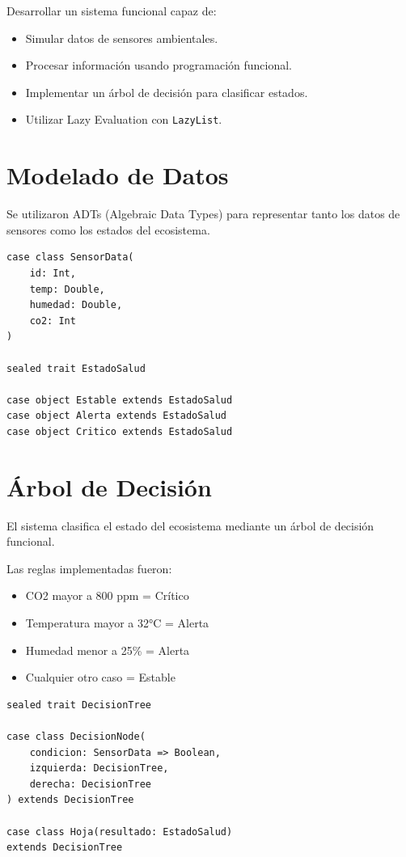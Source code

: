 \documentclass[12pt]{article}
\begin{document}
Desarrollar un sistema funcional capaz de:

\begin{itemize}
    \item Simular datos de sensores ambientales.
    \item Procesar información usando programación funcional.
    \item Implementar un árbol de decisión para clasificar estados.
    \item Utilizar Lazy Evaluation con \texttt{LazyList}.
\end{itemize}


\section{Modelado de Datos}

Se utilizaron ADTs (Algebraic Data Types) para representar tanto los datos de sensores como los estados del ecosistema.

\begin{lstlisting}
case class SensorData(
    id: Int,
    temp: Double,
    humedad: Double,
    co2: Int
)

sealed trait EstadoSalud

case object Estable extends EstadoSalud
case object Alerta extends EstadoSalud
case object Critico extends EstadoSalud
\end{lstlisting}


\section{Árbol de Decisión}

El sistema clasifica el estado del ecosistema mediante un árbol de decisión funcional.

Las reglas implementadas fueron:

\begin{itemize}
    \item CO2 mayor a 800 ppm = Crítico
    \item Temperatura mayor a 32°C = Alerta
    \item Humedad menor a 25\% = Alerta
    \item Cualquier otro caso = Estable
\end{itemize}

\begin{lstlisting}
sealed trait DecisionTree

case class DecisionNode(
    condicion: SensorData => Boolean,
    izquierda: DecisionTree,
    derecha: DecisionTree
) extends DecisionTree

case class Hoja(resultado: EstadoSalud)
extends DecisionTree
\end{lstlisting}
\end{document}
